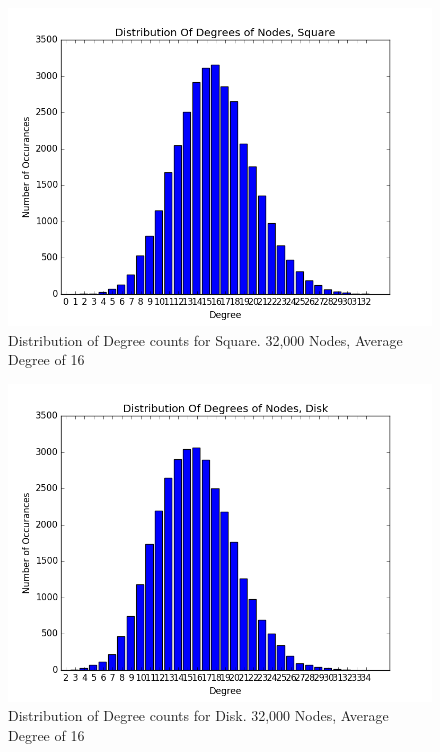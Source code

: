 \documentclass{article}
\begin{document}
\begin{figure}[h]
    \centering
        \includegraphics[scale=0.6]{./graphs/hist_deg_square.png}
        \caption{Distribution of Degree counts for Square. 32,000 Nodes, Average Degree of 16}
        \label{squaredeghist}
\end{figure}

\begin{figure}
    \centering
    \includegraphics[scale=0.6]{./graphs/hist_deg_disk.png}
    \caption{Distribution of Degree counts for Disk. 32,000 Nodes, Average Degree of 16}
    \label{diskdeghist}
\end{figure}
\end{document}
